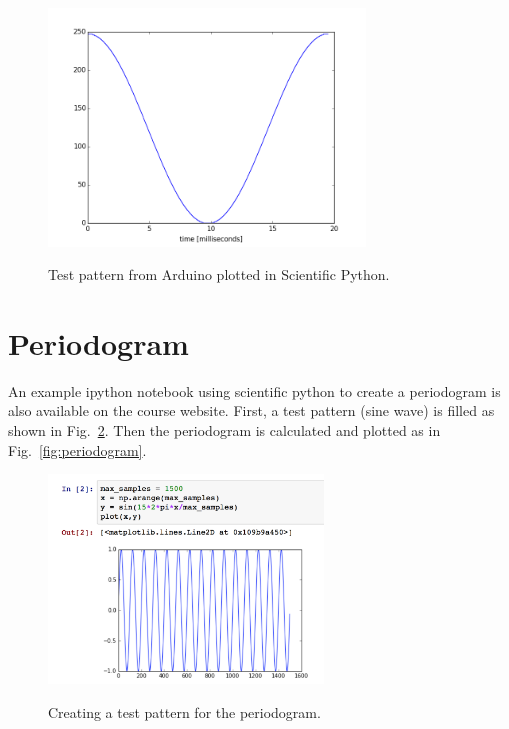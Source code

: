 \documentclass[12pt]{article}
\begin{document}
\begin{figure}[htbp]
\begin{center}
{\includegraphics[width=0.75\textwidth]{figs/waveform.png}}
\end{center}
\caption{\label{fig:wave} Test pattern from Arduino plotted in Scientific Python.}
\end{figure}


\section{Periodogram}

An example ipython notebook using scientific python to create a periodogram is also available on the course website.  First, a test pattern (sine wave) is filled as shown in Fig.~\ref{fig:testpatterns}.  Then the periodogram is calculated and plotted as in Fig.~\ref{fig:periodogram}.

\begin{figure}[htbp]
\begin{center}
{\includegraphics[width=0.65\textwidth]{figs/testpattern.png}}
\end{center}
\caption{\label{fig:testpatterns} Creating a test pattern for the periodogram.}
\end{figure}
\end{document}
